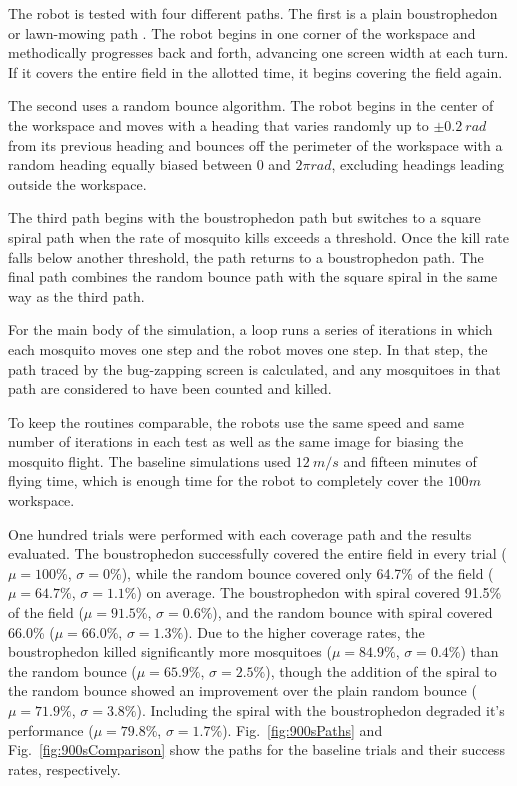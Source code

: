 \documentclass[letterpaper, 10 pt, conference]{ieeeconf}  %
\begin{document}
The robot is tested with four different paths.  The first is a plain boustrophedon or lawn-mowing path \cite{Choset2001}.  The robot begins in one corner of the workspace and methodically progresses back and forth, advancing one screen width at each turn.  If it covers the entire field in the allotted time, it begins covering the field again.

The second uses a random bounce algorithm.  The robot begins in the center of the workspace and moves with a heading that varies randomly up to $\pm 0.2~ rad$ from its previous heading and bounces off the perimeter of the workspace with a random heading equally biased between $0$ and $2\pi rad$, excluding headings leading outside the workspace.

The third path begins with the boustrophedon path but switches to a square spiral path when the rate of mosquito kills exceeds a threshold.  Once the kill rate falls below another threshold, the path returns to a boustrophedon path.  The final path combines the random bounce path with the square spiral in the same way as the third path.

For the main body of the simulation, a loop runs a series of iterations in which each mosquito moves one step and the robot moves one step.  In that step, the path traced by the bug-zapping screen is calculated, and any mosquitoes in that path are considered to have been counted and killed.

To keep the routines comparable, the robots use the same speed and same number of iterations in each test as well as the same image for biasing the mosquito flight.  The baseline simulations used $12~ m/s$ and fifteen minutes of flying time, which is enough time for the robot to completely cover the $100m$ workspace.  

One hundred trials were performed with each coverage path and the results evaluated.  The boustrophedon successfully covered the entire field in every trial ($\mu=100\%$, $\sigma=0\%$), while the random bounce covered only 64.7\% of the field ($\mu=64.7\%$, $\sigma=1.1\%$) on average.  The boustrophedon with spiral covered 91.5\% of the field ($\mu=91.5\%$, $\sigma=0.6\%$), and the random bounce with spiral covered 66.0\% ($\mu=66.0\%$, $\sigma=1.3\%$).  Due to the higher coverage rates, the boustrophedon killed significantly more mosquitoes ($\mu=84.9\%$, $\sigma=0.4\%$) than the random bounce ($\mu=65.9\%$, $\sigma=2.5\%$), though the addition of the spiral to the random bounce showed an improvement over the plain random bounce ($\mu=71.9\%$, $\sigma=3.8\%$).  Including the spiral with the boustrophedon degraded it’s performance ($\mu=79.8\%$, $\sigma=1.7\%$).  Fig.~\ref{fig:900sPaths} and Fig.~\ref{fig:900sComparison} show the paths for the baseline trials and their success rates, respectively.
\end{document}
